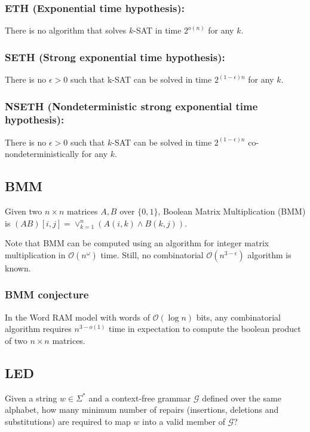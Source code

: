 \documentclass{amsart}
\begin{document}
	\subsubsection{ETH (Exponential time hypothesis):}
	
	There is no algorithm that solves $k$-SAT in time $2^{o(n)}$ for any $k$.
	
	\subsubsection{SETH (Strong exponential time hypothesis):} 
	
	There is no $\epsilon > 0$ such that k-SAT can be solved in time $2^{(1-\epsilon)n}$ for any $k$.
	
	\subsubsection{NSETH (Nondeterministic strong exponential time hypothesis):} 
	
	There is no $\epsilon > 0$ such that $k$-SAT can be solved in time $2^{(1-\epsilon)n}$ co-nondeterministically for any $k$.
	
	\subsection{BMM}
	
	Given two $n \times n$ matrices $A, B$ over $\{0, 1\}$, Boolean Matrix Multiplication (BMM) is $(AB)[i,j] = \vee_{k = 1}^n (A(i,k) \wedge B(k, j))$. 
	
	Note that BMM can be computed using an algorithm for integer matrix multiplication in $\mathcal{O}(n^{\omega})$ time. Still, no combinatorial $\mathcal{O}(n^{3 - \epsilon})$ algorithm is known.
	
	\subsubsection{BMM conjecture~\cite{10.1109/FOCS.2014.53}}
	In the Word RAM model with words of $\mathcal{O}(\log n)$ bits, any combinatorial algorithm requires $n^{3 - o(1)}$ time in expectation to compute the boolean product of two $n \times n$ matrices.
	
	\subsection{LED}
	
	Given a string $w \in \Sigma^*$ and a context-free grammar $\mathcal{G}$ defined over the same alphabet, how many minimum number of repairs (insertions, deletions and substitutions) are required to map $w$ into a valid member of $\mathcal{G}$?
	
\end{document}
